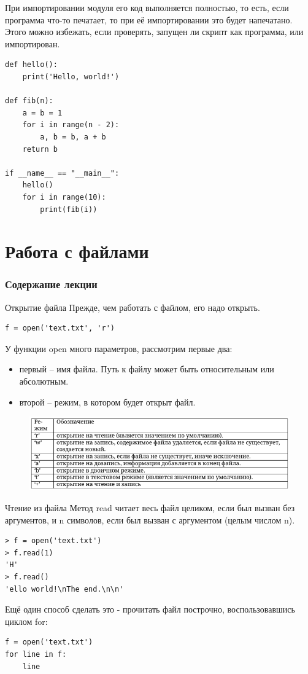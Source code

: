 \documentclass[xcolor=table]{beamer}
\begin{document}
\begin{frame}[fragile]
	При импортировании модуля его код выполняется полностью, то есть, если программа что-то печатает, то при её импортировании это будет напечатано. Этого можно избежать, если проверять, запущен ли скрипт как программа, или импортирован.
	\begin{verbatim}
def hello():
	print('Hello, world!')

def fib(n):
	a = b = 1
	for i in range(n - 2):
		a, b = b, a + b
	return b
	
if __name__ == "__main__":
	hello()
	for i in range(10):
		print(fib(i))
	\end{verbatim}
\end{frame}

\section{Работа с файлами}

\begin{frame}
  \frametitle{Содержание лекции}
  \tableofcontents[current]
\end{frame}

\begin{frame}[fragile]{Открытие файла}
	Прежде, чем работать с файлом, его надо открыть.
	\begin{verbatim}
f = open('text.txt', 'r')
	\end{verbatim}
	
	У функции open много параметров, рассмотрим первые два:
	\begin{itemize}
		\item первый -- имя файла. Путь к файлу может быть относительным или абсолютным. 
		\item второй -- режим, в котором будет открыт файл.	
	\end{itemize}
	\begin{figure}[h]
		\centering
		\includegraphics[scale=0.5]{images/lec11-pic01.png}
	\end{figure}	
\end{frame}

\begin{frame}[fragile]{Чтение из файла}
	Метод read читает весь файл целиком, если был вызван без аргументов, и n
символов, если был вызван с аргументом (целым числом n).
	\begin{verbatim}
> f = open('text.txt')
> f.read(1)
'H'
> f.read()
'ello world!\nThe end.\n\n'
	\end{verbatim}
	
	Ещё один способ сделать это - прочитать файл построчно, воспользовавшись циклом for:
	\begin{verbatim}
f = open('text.txt')
for line in f:
	line
	\end{verbatim}
\end{frame}
\end{document}
